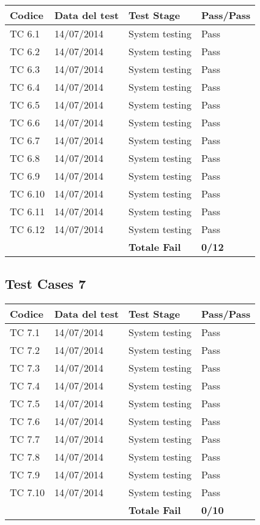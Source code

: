 \begin{tabular}{|p{3cm}|p{3cm}|p{3cm}|p{3cm}|}
	\hline
	\rowcolor{Gray}
	\textbf{Codice} & \textbf{Data del test} & \textbf{Test Stage} & \textbf{Pass/Pass}\tabularnewline
	\hline
	TC 6.1			& 14/07/2014 			& System testing		& Pass \tabularnewline
	\hline
	TC 6.2			& 14/07/2014 			& System testing		& Pass \tabularnewline
	\hline
	TC 6.3			& 14/07/2014 			& System testing		& Pass \tabularnewline
	\hline
	TC 6.4			& 14/07/2014 			& System testing		& Pass \tabularnewline
	\hline
	TC 6.5			& 14/07/2014 			& System testing		& Pass \tabularnewline
	\hline
	TC 6.6			& 14/07/2014 			& System testing		& Pass \tabularnewline
	\hline
	TC 6.7			& 14/07/2014 			& System testing		& Pass \tabularnewline
	\hline
	TC 6.8			& 14/07/2014 			& System testing		& Pass \tabularnewline
	\hline
	TC 6.9			& 14/07/2014 			& System testing		& Pass \tabularnewline
	\hline
	TC 6.10			& 14/07/2014 			& System testing		& Pass \tabularnewline
	\hline
	TC 6.11			& 14/07/2014 			& System testing		& Pass \tabularnewline
	\hline
	TC 6.12			& 14/07/2014 			& System testing		& Pass \tabularnewline
	\hline
					& 						& \textbf{Totale Fail}	& \textbf{0/12} \tabularnewline
	\hline
\end{tabular}

\subsection{Test Cases 7}

\begin{tabular}{|p{3cm}|p{3cm}|p{3cm}|p{3cm}|}
	\hline
	\rowcolor{Gray}
	\textbf{Codice} & \textbf{Data del test} & \textbf{Test Stage} & \textbf{Pass/Pass}\tabularnewline
	\hline
	TC 7.1			& 14/07/2014 			& System testing		& Pass \tabularnewline
	\hline
	TC 7.2			& 14/07/2014 			& System testing		& Pass \tabularnewline
	\hline
	TC 7.3			& 14/07/2014 			& System testing		& Pass \tabularnewline
	\hline
	TC 7.4			& 14/07/2014 			& System testing		& Pass \tabularnewline
	\hline
	TC 7.5			& 14/07/2014 			& System testing		& Pass \tabularnewline
	\hline
	TC 7.6			& 14/07/2014 			& System testing		& Pass \tabularnewline
	\hline
	TC 7.7			& 14/07/2014 			& System testing		& Pass \tabularnewline
	\hline
	TC 7.8			& 14/07/2014 			& System testing		& Pass \tabularnewline
	\hline
	TC 7.9			& 14/07/2014 			& System testing		& Pass \tabularnewline
	\hline
	TC 7.10			& 14/07/2014 			& System testing		& Pass \tabularnewline
	\hline
					& 						& \textbf{Totale Fail}	& \textbf{0/10} \tabularnewline
	\hline
\end{tabular}

